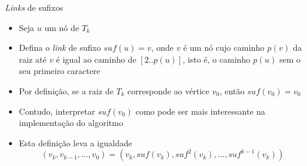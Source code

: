\begin{frame}[fragile]{{\it Links} de sufixos}

    \begin{itemize}
        \item Seja $u$ um nó de $T_k$

        \item Defina o \textit{link} de sufixo $suf(u) = v$, onde $v$ é um nó cujo caminho 
            $p(v)$ da raiz até $v$ é igual 
            ao caminho de $[2..p(u)]$, isto é, o caminho $p(u)$ sem o seu primeiro caractere

        \item Por definição, se a raiz de $T_k$ corresponde ao vértice $v_0$, então 
            $suf(v_0) = v_0$

        \item Contudo, interpretar $suf(v_0)$ como  pode ser mais 
            interessante na implementação do algoritmo

        \item Esta definição leva a igualdade
        \[
            (v_k, v_{k-1}, \ldots, v_0) = (v_k, suf(v_k), suf^2(v_k), \ldots, suf^{k - 1}(v_k))
        \]

    \end{itemize}

\end{frame}

